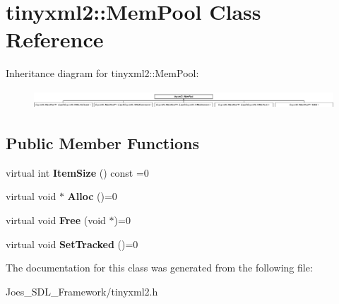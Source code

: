 \hypertarget{classtinyxml2_1_1_mem_pool}{\section{tinyxml2\-:\-:Mem\-Pool Class Reference}
\label{classtinyxml2_1_1_mem_pool}
}
Inheritance diagram for tinyxml2\-:\-:Mem\-Pool\-:\begin{figure}[H]
\begin{center}
\leavevmode
\includegraphics[height=0.691358cm]{classtinyxml2_1_1_mem_pool}
\end{center}
\end{figure}
\subsection*{Public Member Functions}
\begin{DoxyCompactItemize}
\item 
\hypertarget{classtinyxml2_1_1_mem_pool_a0c518d49e3a94bde566f61e13b7240bb}{virtual int {\bfseries Item\-Size} () const =0}\label{classtinyxml2_1_1_mem_pool_a0c518d49e3a94bde566f61e13b7240bb}

\item 
\hypertarget{classtinyxml2_1_1_mem_pool_a4f977b5fed752c0bbfe5295f469d6449}{virtual void $\ast$ {\bfseries Alloc} ()=0}\label{classtinyxml2_1_1_mem_pool_a4f977b5fed752c0bbfe5295f469d6449}

\item 
\hypertarget{classtinyxml2_1_1_mem_pool_a49e3bfac2cba2ebd6776b31e571f64f7}{virtual void {\bfseries Free} (void $\ast$)=0}\label{classtinyxml2_1_1_mem_pool_a49e3bfac2cba2ebd6776b31e571f64f7}

\item 
\hypertarget{classtinyxml2_1_1_mem_pool_ac5804dd1387b2e4de5eef710076a0db1}{virtual void {\bfseries Set\-Tracked} ()=0}\label{classtinyxml2_1_1_mem_pool_ac5804dd1387b2e4de5eef710076a0db1}

\end{DoxyCompactItemize}


The documentation for this class was generated from the following file\-:\begin{DoxyCompactItemize}
\item 
Joes\-\_\-\-S\-D\-L\-\_\-\-Framework/tinyxml2.\-h\end{DoxyCompactItemize}

